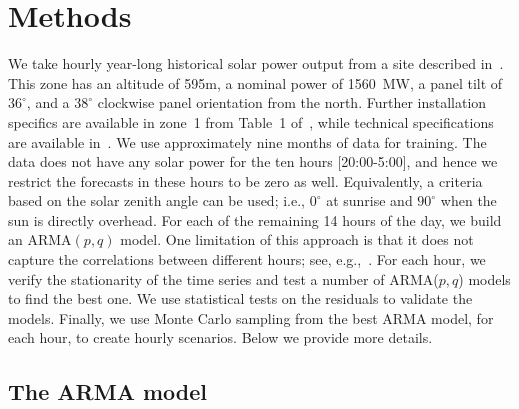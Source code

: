 \documentclass[review]{elsarticle}
\begin{document}
% 

\section{Methods}
We take hourly year-long historical solar power output 
from a site described in~\cite{golestaneh2016generation}. 
This zone has an altitude of 595m, a nominal power of 1560~MW, a panel 
tilt 
of $36^\circ$, and a $38^\circ$ clockwise panel orientation from the north. 
Further installation specifics are available in zone~1 from Table~1 
of~\cite{golestaneh2016generation}, while technical specifications are 
available 
in~\cite{technical}.  We use approximately nine months of data 
for training. The data does not have any solar power for the ten hours 
[20:00-5:00], and hence we restrict the forecasts in these hours to be zero as 
well. Equivalently, a criteria based on the solar zenith angle can be used; 
i.e., $0^\circ$ at sunrise and $90^\circ$ when the sun is directly overhead. 
For 
each of the remaining 14 hours of the day, we build an ARMA$(p,q)$ 
model. One limitation of this approach is that it does not capture the 
correlations between different hours; see, e.g.,~\cite{pedro2012assessment}. 
For each hour, we verify the stationarity of the time 
series and test a number of ARMA($p,q$) models to find the best 
one. We use statistical tests on the residuals to validate the models. Finally, 
we use Monte Carlo sampling from the best ARMA model, for each hour, to create 
hourly scenarios. Below we provide more details.

\subsection{The ARMA model}
\end{document}

